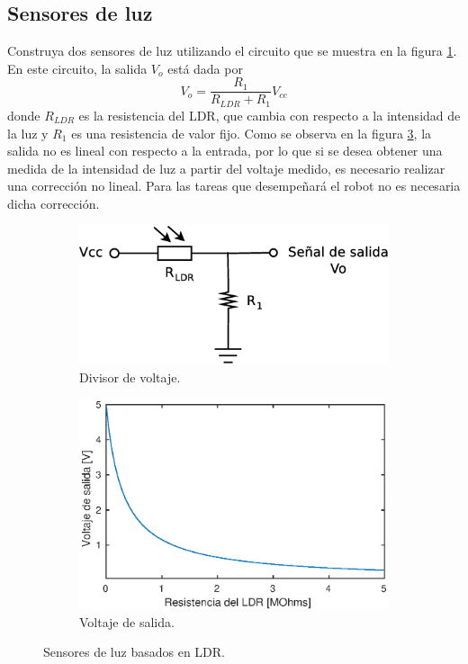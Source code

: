 \documentclass[a4paper,12pt]{article}
\begin{document}
\subsection{Sensores de luz}
Construya dos sensores de luz utilizando el circuito que se muestra en la figura \ref{fig:LDR}. En este circuito, la salida $V_o$ está dada por
\[V_o = \frac{R_1}{R_{LDR} + R_1}V_{cc}\]
donde $R_{LDR}$ es la resistencia del LDR, que cambia con respecto a la intensidad de la luz y $R_1$ es una resistencia de valor fijo. Como se observa en la figura \ref{fig:LDRVo}, la salida no es lineal con respecto a la entrada, por lo que si se desea obtener una medida de la intensidad de luz a partir del voltaje medido, es necesario realizar una corrección no lineal. Para las tareas que desempeñará el robot no es necesaria dicha corrección. 
\begin{figure}
  \centering
  \begin{subfigure}[b]{0.43\textwidth}
    \centering
    \includegraphics[width=\textwidth]{Figures/LDR.eps}
    \caption{Divisor de voltaje.}
    \label{fig:LDR}
  \end{subfigure}
  \qquad\qquad
  \begin{subfigure}[b]{0.43\textwidth}
    \centering
    \includegraphics[width=\textwidth]{Figures/LDR_Vo.eps}
    \caption{Voltaje de salida.}
    \label{fig:LDRVo}
  \end{subfigure}
\caption{Sensores de luz basados en LDR.}
\end{figure}
\end{document}
